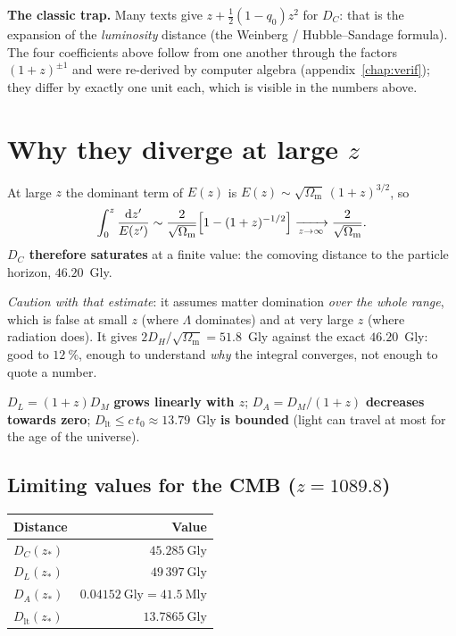 \documentclass[11pt,a4paper,openany]{report}
\newcommand{\Gly}{\text{Gly}}
\newcommand{\Om}{\Omega_{\mathrm{m}}}
\newcommand{\dif}{\mathrm{d}}
\begin{document}
\begin{tcolorbox}[warning]
\textbf{The classic trap.} Many texts give $z + \tfrac12(1-q_0)z^2$ for
$D_{C}$: that is the expansion of the \emph{luminosity} distance (the
Weinberg / Hubble--Sandage formula). The four coefficients above follow from
one another through the factors $(1+z)^{\pm1}$ and were re-derived by computer
algebra (appendix~\ref{chap:verif}); they differ by exactly one unit each,
which is visible in the numbers above.
\end{tcolorbox}

\section{Why they diverge at large $z$}

\begin{tcolorbox}[undergrad]
At large $z$ the dominant term of $E(z)$ is $E(z) \sim \sqrt{\Om}\,(1+z)^{3/2}$,
so
\[
\int_{0}^{z}\frac{\dif z'}{E(z')} \sim \frac{2}{\sqrt{\Om}}\Bigl[1 - (1+z)^{-1/2}\Bigr]
\xrightarrow[z\to\infty]{} \frac{2}{\sqrt{\Om}}.
\]
\textbf{$D_{C}$ therefore saturates} at a finite value: the comoving distance to
the particle horizon, $46.20$~Gly.

\medskip
\emph{Caution with that estimate}: it assumes matter domination \emph{over the
whole range}, which is false at small $z$ (where $\Lambda$ dominates) and at
very large $z$ (where radiation does). It gives $2D_{H}/\sqrt{\Om} = 51.8$~Gly
against the exact $46.20$~Gly: good to $12~\%$, enough to understand \emph{why}
the integral converges, not enough to quote a number.

\medskip
$D_{L} = (1+z) D_{M}$ \textbf{grows linearly with $z$}; $D_{A} = D_{M}/(1+z)$
\textbf{decreases towards zero}; $D_{\text{lt}} \le c\,t_{0} \approx 13.79$~Gly
\textbf{is bounded} (light can travel at most for the age of the universe).
\end{tcolorbox}

\subsection{Limiting values for the CMB ($z = 1089.8$)}

\begin{center}
\renewcommand{\arraystretch}{1.3}
\begin{tabular}{lr}
\toprule
\textbf{Distance} & \textbf{Value} \\
\midrule
$D_{C}(z_{*})$        & $45.285~\Gly$ \\
$D_{L}(z_{*})$        & $49\,397~\Gly$ \\
$D_{A}(z_{*})$        & $0.04152~\Gly = 41.5~\text{Mly}$ \\
$D_{\text{lt}}(z_{*})$ & $13.7865~\Gly$ \\
\bottomrule
\end{tabular}
\end{center}
\end{document}
